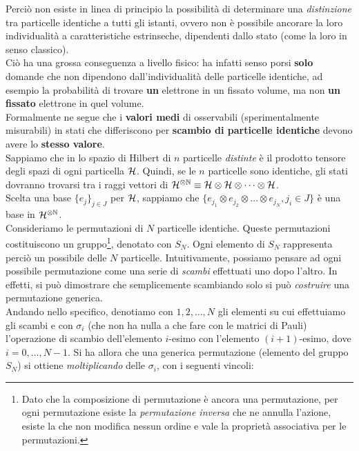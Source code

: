 \documentclass[../../FisicaTeorica.tex]{subfiles}
\begin{document}
Perciò non esiste in linea di principio la possibilità di determinare una \textit{distinzione} tra particelle identiche a tutti gli istanti, ovvero non è possibile ancorare la loro individualità a caratteristiche estrinseche, dipendenti dallo stato (come la loro  in senso classico).\\
Ciò ha una grossa conseguenza a livello fisico: ha infatti senso porsi \textbf{solo} domande che non dipendono dall'individualità delle particelle identiche, ad esempio la probabilità di trovare \textbf{un} elettrone in un fissato volume, ma non \textbf{un fissato} elettrone in quel volume.\\
Formalmente ne segue che i \textbf{valori medi} di osservabili (sperimentalmente misurabili) in stati che differiscono per \textbf{scambio di particelle identiche} devono avere lo \textbf{stesso valore}.\\
Sappiamo che in \MQ lo spazio di Hilbert di $n$ particelle \textit{distinte} è il prodotto tensore degli spazi di ogni particella $\mathcal{H}$. Quindi, se le $n$ particelle sono identiche, gli stati dovranno trovarsi tra i raggi vettori di $\mathcal{H}^{\otimes \mathbb{N}} \equiv \mathcal{H} \otimes \mathcal{H} \otimes \dots \otimes \mathcal{H}$.\\
Scelta una base $\{e_j\}_{j\in J}$ per $\mathcal{H}$, sappiamo che $\{e_{j_1}\otimes e_{j_2} \otimes \dots \otimes e_{j_N}, j_i \in J\}$ è una base in $\mathcal{H}^{\otimes \mathbb{N}}$.\\
Consideriamo le permutazioni di $N$ particelle identiche. Queste permutazioni costituiscono un gruppo\footnote{Dato che la composizione di permutazione è ancora una permutazione, per ogni permutazione esiste la \textit{permutazione inversa} che ne annulla l'azione, esiste la  che non modifica nessun ordine e vale la proprietà associativa per le permutazioni.}, denotato con $S_N$. Ogni elemento di $S_N$ rappresenta perciò un possibile  delle $N$ particelle. Intuitivamente, possiamo pensare ad ogni possibile permutazione come una serie di \textit{scambi} effettuati uno dopo l'altro. In effetti, si può dimostrare che semplicemente scambiando solo  si può \textit{costruire} una permutazione generica.\\
Andando nello specifico, denotiamo con $1,2,\dots,N$ gli elementi su cui effettuiamo gli scambi e con $\sigma_i$ (che non ha nulla a che fare con le matrici di Pauli) l'operazione di scambio dell'elemento $i$-esimo con l'elemento $(i+1)$-esimo, dove $i = 0,\dots,N-1$. Si ha allora che una generica permutazione (elemento del gruppo $S_N$) si ottiene \textit{moltiplicando} delle $\sigma_i$, con i seguenti vincoli:
\end{document}

